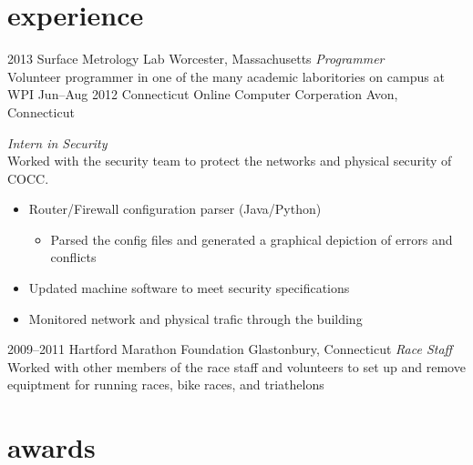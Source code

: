 \documentclass[]{friggeri-cv} %
\begin{document}

\section{experience}

\begin{entrylist}
\entry
{2013}
{Surface Metrology Lab}
{Worcester, Massachusetts}
{\emph{Programmer} \\
Volunteer programmer in one of the many academic laboritories on campus at WPI}
\entry
{Jun--Aug 2012}
{Connecticut Online Computer Corperation}
{Avon, Connecticut}
{\emph{Intern in Security} \\
	Worked with the security team to protect the networks and physical security of COCC.
	\begin{itemize}
		\item Router/Firewall configuration parser (Java/Python)
		\begin{itemize}
			\item Parsed the config files and generated a graphical depiction of errors and conflicts
		\end{itemize}
		\item Updated machine software to meet security specifications
		\item Monitored network and physical trafic through the building
	\end{itemize}
}
\entry
{2009--2011}
{Hartford Marathon Foundation}
{Glastonbury, Connecticut}
{\emph{Race Staff} \\
Worked with other members of the race staff and volunteers to set up and remove equiptment for running races, bike races, and triathelons}
\end{entrylist}


\section{awards}
\end{document}
